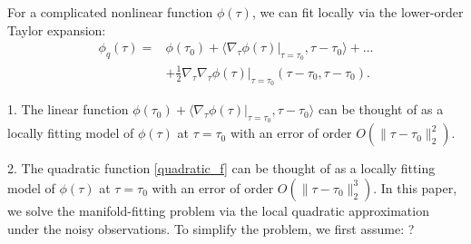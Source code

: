 \documentclass{article}
\newtheorem{assumption}[theorem]{Assumption}
\theoremstyle{remark}
\begin{document}
For a complicated nonlinear function $\phi(\tau)$, we can fit locally via the lower-order Taylor expansion:
\begin{equation}\label{quadratic_f}
\begin{aligned}
\phi_q(\tau) = &\phi(\tau_0) + \langle \nabla_\tau \phi(\tau)|_{\tau=\tau_0}, \tau-\tau_0 \rangle +...\\
&+ \frac{1}{2} \nabla_\tau \nabla_\tau \phi(\tau)|_{\tau=\tau_0} (\tau-\tau_0,\tau-\tau_0).
\end{aligned}
\end{equation}

1. The linear function
$
\phi(\tau_0) + \langle \nabla_\tau \phi(\tau)|_{\tau=\tau_0}, \tau-\tau_0 \rangle
$ 
can be thought of as a locally fitting model of $\phi(\tau)$ at $\tau=\tau_0$ with an error of order $O(\|\tau-\tau_0 \|_2^2)$.

2. The quadratic function \eqref{quadratic_f} can be thought of as a locally fitting model of $\phi(\tau)$ at $\tau=\tau_0$ with an error of order $O(\|\tau-\tau_0 \|_2^3)$.
In this paper, we solve the manifold-fitting problem via the local quadratic approximation under the noisy observations. {\color{red}To simplify the problem, we first assume: ?}
\end{document}
